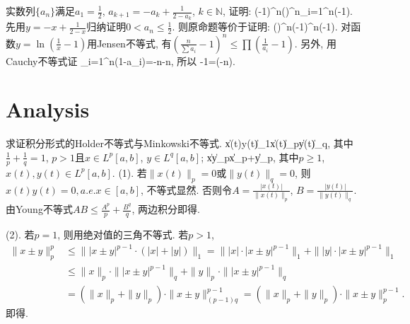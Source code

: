 实数列$\{a_n\}$满足$a_1=\frac12$, $a_{k+1}=-a_{k}+\frac1{2-a_k}$, $k\in\mathbb{N}$, 证明: 
\bee
\left(-1\right)^n\le\left(\right)^n\prod_{i=1}^{n}\left(-1\right).
\eee
\eq
\ba
先用$y=-x+\frac{1}{2-x}$归纳证明$0<a_n\le\frac{1}{2}$. 则原命题等价于证明:
\bee
\left(\right)^n\left(-1\right)^n\le\prod\left(-1\right).
\eee
对函数$y=\ln\left(\frac{1}{x}-1\right)$用Jensen不等式, 有$\left(\frac{n}{\sum a_i}-1\right)^n\le\prod\left(\frac{1}{a_i}-1\right)$.
另外, 用Cauchy不等式证
\bee
\sum_{i=1}^{n}(1-a_i)=\sum{}-n\ge{}-n, 
\eee
所以
\bee
{}-1=\ge{}\left(-n\right).
\eee
\ea

\section{Analysis}
\bq{}{}
求证积分形式的Holder不等式与Minkowski不等式.
\bee
\|x(t)y(t)\|_1\le\|x(t)\|_{p}\cdot\|y(t)\|_q,
\eee
其中$\frac1p+\frac1q=1$, $p>1$且$x\in L^p[a,b]$, $y\in L^q[a,b]$;
\bee
\|x\pm y\|_p\le\|x\|_p+\|y\|_p,
\eee
其中$p\ge 1$, $x(t),y(t)\in L^p[a,b]$.
\eq
\ba
(1). 若$\|x(t)\|_p=0$或$\|y(t)\|_q=0$, 则$x(t)y(t)=0, a.e. x\in[a,b]$, 不等式显然. 否则令$A=\frac{|x(t)|}{\|x(t)\|_p}$, $B=\frac{|y(t)|}{\|y(t)\|_q}$.
由Young不等式$AB\le\frac{A^p}{p}+\frac{B^q}{q}$, 两边积分即得.

(2). 若$p=1$, 则用绝对值的三角不等式. 若$p>1$, 
\begin{align*}
 \|x\pm y\|_p^p & \le \||x\pm y|^{p-1}\cdot(|x|+|y|)\|_1=\||x|\cdot|x\pm y|^{p-1}\|_1+\||y|\cdot|x\pm y|^{p-1}\|_1\\
  & \le\|x\|_p\cdot\||x\pm y|^{p-1}\|_q+\|y\|_p\cdot\||x\pm y|^{p-1}\|_q\\
  & = (\|x\|_p+\|y\|_p)\cdot\|x\pm y\|_{(p-1)q}^{p-1}=(\|x\|_p+\|y\|_p)\cdot\|x\pm y\|_p^{p-1}.
\end{align*}
即得.
\ea